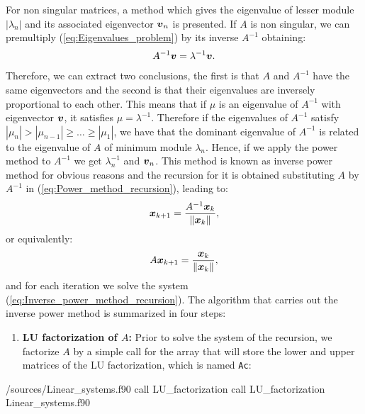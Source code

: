      For non singular matrices, a method which gives the eigenvalue of lesser module $|\lambda_n|$ and its associated eigenvector $\boldsymbol{v}_n$ is presented. If $A$ is non singular, we can premultiply (\ref{eq:Eigenvalues_problem}) by its inverse $A^{-1}$ obtaining:
     \begin{align}
     	A^{-1}\boldsymbol{v} = \lambda^{-1}\boldsymbol{v}.
     \end{align}
     Therefore, we can extract two conclusions, the first is that $A$ and $A^{-1}$ have the same eigenvectors and the second is that their eigenvalues are inversely proportional to each other. This means that if $\mu$ is an eigenvalue of $A^{-1}$ with eigenvector $\boldsymbol{v}$, it satisfies $\mu=\lambda^{-1}$. Therefore if the eigenvalues of $A^{-1}$ satisfy $|\mu_n|>|\mu_{n-1}|\geq\dots\geq|\mu_{1}|$, we have that the dominant eigenvalue of $A^{-1}$ is related to the eigenvalue of $A$ of minimum module $\lambda_n$. Hence, if we apply the power method to $A^{-1}$ we get $\lambda_n^{-1}$ and $\boldsymbol{v}_n$. This method is known as inverse power method for obvious reasons and the recursion for it is obtained substituting $A$ by $A^{-1}$ in (\ref{eq:Power_method_recursion}), leading to:
     \begin{align*}
     	\boldsymbol{x}_{k+1}
     	=
     	\frac{A^{-1}\boldsymbol{x}_{k}}{\norm{\boldsymbol{x}_{k}}}
     	,
     \end{align*}
     or equivalently:
     \begin{align}
     A\boldsymbol{x}_{k+1}
     =
     \frac{\boldsymbol{x}_{k}}{\norm{\boldsymbol{x}_{k}}}
     ,
     \label{eq:Inverse_power_method_recursion}
     \end{align}
     and for each iteration we solve the system (\ref{eq:Inverse_power_method_recursion}).
     The algorithm that carries out the inverse power method is summarized in four steps:
     
     \begin{enumerate}
     	\item \textbf{LU factorization of $A$:} Prior to solve the system of the recursion, we factorize $A$ by a simple call for the array that will store the lower and upper matrices of the LU factorization, which is named \verb|Ac|:
     \end{enumerate}
     \listings
     {\home/sources/Linear_systems.f90}
     {call LU_factorization}
     {call LU_factorization}
     {Linear_systems.f90}
  
